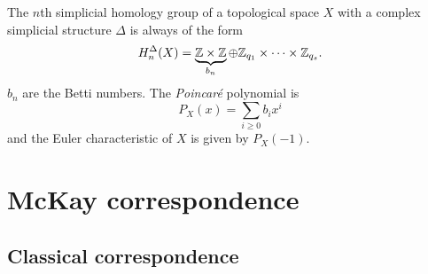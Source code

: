         The $n$th simplicial homology group of a topological space $X$ with a complex simplicial structure $\Delta$ is always of the form
        \begin{equation}
            H^\Delta_n(X)=\underbrace{\mathbb{Z}\times\mathbb{Z}}_{b_n}\oplus\mathbb{Z}_{q_1}\times\dots\times\mathbb{Z}_{q_s}.
        \end{equation}
        $b_n$ are the Betti numbers. The \emph{Poincaré} polynomial is
        \begin{equation}
            P_X(x)=\sum_{i\geq 0}b_ix^i
        \end{equation}
        and the Euler characteristic of $X$ is given by $P_X(-1)$.

\section{McKay correspondence}\label{app:McKay}

    \subsection{Classical correspondence}


